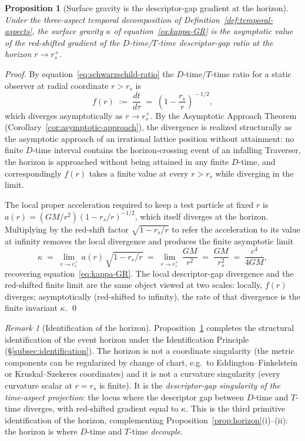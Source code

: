 \documentclass[11pt,a4paper]{article}
\newtheorem{proposition}[theorem]{Proposition}
\theoremstyle{definition}
\theoremstyle{remark}
\newtheorem{remark}[theorem]{Remark}
\begin{document}
\begin{proposition}[Surface gravity is the descriptor-gap gradient at the horizon]\label{prop:kappa-gradient}
Under the three-aspect temporal decomposition of Definition~\ref{def:temporal-aspects}, the surface gravity $\kappa$ of equation~\eqref{eq:kappa-GR} is the asymptotic value of the red-shifted gradient of the $D$-time/$T$-time descriptor-gap ratio at the horizon $r \to r_{s}^{+}$.
\end{proposition}

\begin{proof}
By equation~\eqref{eq:schwarzschild-ratio} the $D$-time/$T$-time ratio for a static observer at radial coordinate $r > r_{s}$ is
\[
f(r) \;:=\; \frac{dt}{d\tau} \;=\; \left(1 - \frac{r_{s}}{r}\right)^{\!-1/2},
\]
which diverges asymptotically as $r \to r_{s}^{+}$. By the Asymptotic Approach Theorem (Corollary~\ref{cor:asymptotic-approach}), the divergence is realized structurally as the asymptotic approach of an irrational lattice position without attainment: no finite $D$-time interval contains the horizon-crossing event of an infalling Traverser, the horizon is approached without being attained in any finite $D$-time, and correspondingly $f(r)$ takes a finite value at every $r > r_{s}$ while diverging in the limit.

The local proper acceleration required to keep a test particle at fixed $r$ is $a(r) = (GM/r^{2})(1 - r_{s}/r)^{-1/2}$, which itself diverges at the horizon. Multiplying by the red-shift factor $\sqrt{1 - r_{s}/r}$ to refer the acceleration to its value at infinity removes the local divergence and produces the finite asymptotic limit
\[
\kappa \;=\; \lim_{r \to r_{s}^{+}}\, a(r)\,\sqrt{1 - r_{s}/r}
       \;=\; \lim_{r \to r_{s}^{+}}\, \frac{GM}{r^{2}}
       \;=\; \frac{GM}{r_{s}^{2}}
       \;=\; \frac{c^{4}}{4GM},
\]
recovering equation~\eqref{eq:kappa-GR}. The local descriptor-gap divergence and the red-shifted finite limit are the same object viewed at two scales: locally, $f(r)$ diverges; asymptotically (red-shifted to infinity), the rate of that divergence is the finite invariant $\kappa$. \qed
\end{proof}

\begin{remark}[Identification of the horizon]\label{rem:horizon-identification}
Proposition~\ref{prop:kappa-gradient} completes the structural identification of the event horizon under the Identification Principle (\S\ref{subsec:identification}). The horizon is not a coordinate singularity (the metric components can be regularized by change of chart, e.g.\ to Eddington--Finkelstein or Kruskal--Szekeres coordinates) and it is not a curvature singularity (every curvature scalar at $r = r_{s}$ is finite). It is the \emph{descriptor-gap singularity of the time-aspect projection}: the locus where the descriptor gap between $D$-time and $T$-time diverges, with red-shifted gradient equal to $\kappa$. This is the third primitive identification of the horizon, complementing Proposition~\ref{prop:horizon}(i)--(ii): the horizon is where $D$-time and $T$-time \emph{decouple}.
\end{remark}
\end{document}
